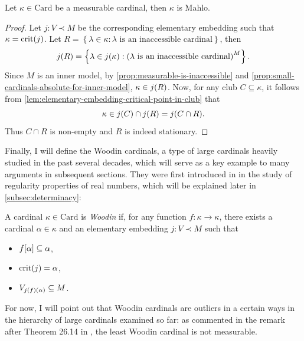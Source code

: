 \documentclass[12pt]{article}
\theoremstyle{plain}
\theoremstyle{definition}
\newcommand{\Card}{\mathrm{Card}}
\DeclareMathOperator{\crit}{crit}
\begin{document}
\begin{proposition}
	Let $\kappa \in \Card$ be a measurable cardinal, then $\kappa$ is Mahlo.
\end{proposition}

\begin{proof}
	Let $j : V \prec M$ be the corresponding elementary embedding such that $\kappa = \crit\mleft(j\mright)$. Let $R = \left\{\lambda \in \kappa : \text{$\lambda$ is an inaccessible cardinal}\right\}$, then
	\[j\mleft(R\mright) = \left\{\lambda \in j\mleft(\kappa\mright) : \left(\text{$\lambda$ is an inaccessible cardinal}\right)^M\right\}.\]
	Since $M$ is an inner model, by \autoref{prop:measurable-is-inaccessible} and \autoref{prop:small-cardinals-absolute-for-inner-model}, $\kappa \in j\mleft(R\mright)$. Now, for any club $C \subseteq \kappa$, it follows from \autoref{lem:elementary-embedding-critical-point-in-club} that
	\[\kappa \in j\mleft(C\mright) \cap j\mleft(R\mright) = j\mleft(C \cap R\mright).\]
	Thus $C \cap R$ is non-empty and $R$ is indeed stationary.
\end{proof}

Finally, I will define the Woodin cardinals, a type of large cardinals heavily studied in the past several decades, which will serve as a key example to many arguments in subsequent sections. They were first introduced in \cite{woodin-cardinals} in the study of regularity properties of real numbers, which will be explained later in \autoref{subsec:determinacy}:

\begin{definition}
	A cardinal $\kappa \in \Card$ is \emph{Woodin} if, for any function $f : \kappa \rightarrow \kappa$, there exists a cardinal $\alpha \in \kappa$ and an elementary embedding $j : V \prec M$ such that
	\begin{itemize}
		\item $f\mleft[\alpha\mright] \subseteq \alpha$,
		\item $\crit\mleft(j\mright) = \alpha$,
		\item $V_{j\mleft(f\mright)\mleft(\alpha\mright)} \subseteq M$.
	\end{itemize}
\end{definition}

For now, I will point out that Woodin cardinals are outliers in a certain ways in the hierarchy of large cardinals examined so far: as commented in the remark after Theorem 26.14 in \cite{higher-infinite}, the least Woodin cardinal is not measurable.
\end{document}
